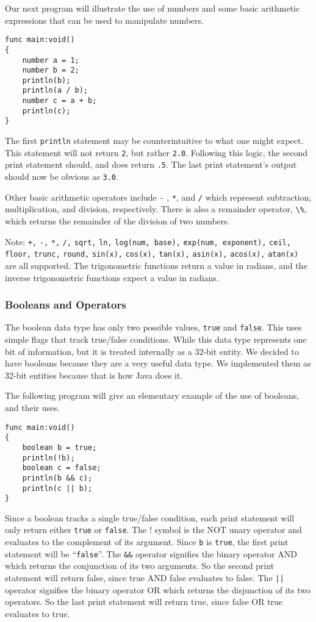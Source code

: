 Our next program will illustrate the use of numbers and some basic arithmetic expressions that can be used to manipulate numbers.

\begin{verbatim}
func main:void()
{
    number a = 1;
    number b = 2;
    println(b);
    println(a / b);
    number c = a + b;
    println(c);
}
\end{verbatim}

The first \verb=println= statement may be counterintuitive to what one might expect.  This statement will not return \verb=2=, but rather \verb=2.0=.  Following this logic, the second print statement should, and does return \verb=.5=.  The last print statement's output should now be obvious as \verb=3.0=.

Other basic arithmetic operators include \verb=-= , \verb=*=, and \verb=/= which represent subtraction, multiplication, and division, respectively.  There is also a remainder operator, \verb=\%=,  which returns the remainder of the division of two numbers.

Note: \verb=+,= \verb=-,= \verb=*,= \verb=/,= \verb=sqrt,= \verb=ln,= \verb=log(num, base),= \verb=exp(num, exponent),= \verb=ceil,= \verb=floor,= \verb=trunc,= \verb=round,= \verb=sin(x),= \verb=cos(x),= \verb=tan(x),= \verb=asin(x),= \verb=acos(x),= \verb=atan(x)= are all supported. The trigonometric functions return a value in radians, and the inverse trigonometric functions expect a value in radians.

\subsubsection{Booleans and Operators}
The boolean data type has only two possible values, \verb=true= and \verb=false=.  This uses simple flags that track true/false conditions. While this data type represents one bit of information, but it is treated internally as a 32-bit entity. We decided to have booleans because they are a very useful data type. We implemented them as 32-bit entities because that is how Java does it.

The following program will give an elementary example of the use of booleans, and their uses.  

\begin{verbatim}
func main:void()
{
    boolean b = true;
    println(!b);
    boolean c = false;
    println(b && c);
    println(c || b);  
}
\end{verbatim}

Since a boolean tracks a single true/false condition, each print statement will only return either \verb=true= or \verb=false=.  The ! symbol is the NOT unary operator and evaluates to the complement of its argument.  Since \verb=b= is \verb=true=, the first print statement will be ``\verb=false=''.  The \verb=&&= operator signifies the binary operator AND which returns the conjunction of its two arguments.  So the second print statement will return false, since true AND false evaluates to false. The \verb=||= operator signifies the binary operator OR which returns the disjunction of its two operators.  So the last print statement will return true, since false OR true evaluates to true. 

